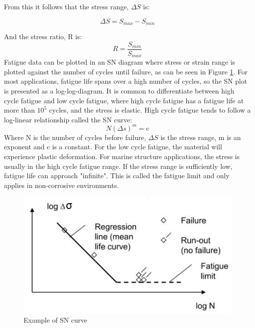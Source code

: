 From this it follows that the stress range, $\Delta S$ is:

\begin{equation}
    \Delta S =S_{max} - S_{min}
\end{equation}

\noindent And the stress ratio, R is:
\begin{equation}
    R=\frac{S_{min}}{S_{max}}
\end{equation}
Fatigue data can be plotted in an SN diagram where stress or strain range is plotted against the number of cycles until failure, as can be seen in Figure \ref{fig:sn}. For most applications, fatigue life spans over a high number of cycles, so the SN plot is presented as a log-log-diagram. It is common to differentiate between high cycle fatigue and low cycle fatigue, where high cycle fatigue has a fatigue life at more than $10^5$ cycles, and the stress is elastic. High cycle fatigue tends to follow a log-linear relationship called the SN curve:
\begin{equation}
    N(\Delta s)^m = \text{c}
\end{equation}
\label{eq:sn}
Where N is the number of cycles before failure, $\Delta S$ is the stress range, m is an exponent and c is a constant.\newline
\newline
For the low cycle fatigue, the material will experience plastic deformation. For marine structure applications, the stress is usually in the high cycle fatigue range. If the stress range is sufficiently low, fatigue life can approach "infinite". This is called the fatigue limit and only applies in non-corrosive environments. 

\begin{figure}[h!]
\centering
\includegraphics[scale=1]{figures/sn}
\caption[$\; \:$Example of SN curve]{Example of SN curve  \cite{fatigue2016} }
 \label{fig:sn}
\end{figure}

